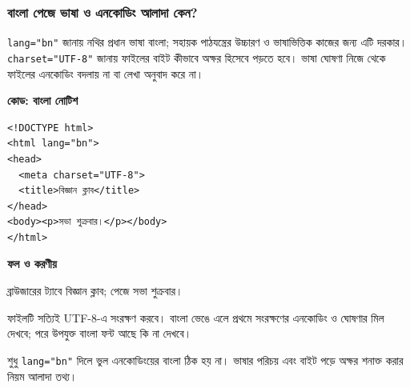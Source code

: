 \subsubsection{বাংলা পেজে ভাষা ও এনকোডিং আলাদা কেন?}
\texttt{lang="bn"} জানায় নথির প্রধান ভাষা বাংলা; সহায়ক পাঠযন্ত্রের উচ্চারণ ও ভাষাভিত্তিক কাজের জন্য এটি দরকার। \texttt{charset="UTF-8"} জানায় ফাইলের বাইট কীভাবে অক্ষর হিসেবে পড়তে হবে। ভাষা ঘোষণা নিজে থেকে ফাইলের এনকোডিং বদলায় না বা লেখা অনুবাদ করে না।

\par\noindent\begin{minipage}[t]{.54\linewidth}\vspace{0pt}\small
\textbf{\color{chFourTeal}কোড: বাংলা নোটিশ}\par
\begin{chFourBanglaCode}
\begin{verbatim}
<!DOCTYPE html>
<html lang="bn">
<head>
  <meta charset="UTF-8">
  <title>বিজ্ঞান ক্লাব</title>
</head>
<body><p>সভা শুক্রবার।</p></body>
</html>
\end{verbatim}
\end{chFourBanglaCode}
\end{minipage}\hfill
\begin{minipage}[t]{.42\linewidth}\vspace{0pt}\small
\textbf{\color{chFourTeal}ফল ও করণীয়}\par
ব্রাউজারের ট্যাবে বিজ্ঞান ক্লাব; পেজে সভা শুক্রবার।\par
ফাইলটি সত্যিই UTF-8-এ সংরক্ষণ করবে। বাংলা ভেঙে এলে প্রথমে সংরক্ষণের এনকোডিং ও ঘোষণার মিল দেখবে; পরে উপযুক্ত বাংলা ফন্ট আছে কি না দেখবে।
\end{minipage}\par
শুধু \texttt{lang="bn"} দিলে ভুল এনকোডিংয়ের বাংলা ঠিক হয় না। ভাষার পরিচয় এবং বাইট পড়ে অক্ষর শনাক্ত করার নিয়ম আলাদা তথ্য।
